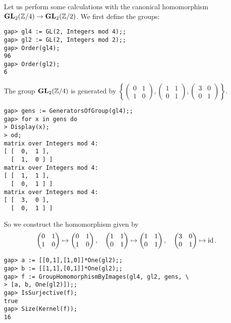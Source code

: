 \begin{example}
    Let us perform some calculations with the canonical homomorphism 
    $\mathbf{GL}_2(\mathbb{Z}/4)\to \mathbf{GL}_2(\mathbb{Z}/2)$. We first
    define the groups:
\begin{lstlisting}
gap> gl4 := GL(2, Integers mod 4);;
gap> gl2 := GL(2, Integers mod 2);;
gap> Order(gl4);
96
gap> Order(gl2);
6
\end{lstlisting}
The group $\mathbf{GL}_2(\mathbb{Z}/4)$ is generated by
$\left\{
\begin{pmatrix}
    0&1\\
    1&0
\end{pmatrix},
\begin{pmatrix}
    1&1\\
    0&1
\end{pmatrix},
\begin{pmatrix}
    3&0\\
    0&1
\end{pmatrix}\right\}$.
\begin{lstlisting}
gap> gens := GeneratorsOfGroup(gl4);;
gap> for x in gens do
> Display(x);
> od;
matrix over Integers mod 4:
[ [  0,  1 ],
  [  1,  0 ] ]
matrix over Integers mod 4:
[ [  1,  1 ],
  [  0,  1 ] ]
matrix over Integers mod 4:
[ [  3,  0 ],
  [  0,  1 ] ]
\end{lstlisting}
So we construct the homomorphism given by
\[
\begin{pmatrix}
    0&1\\
    1&0
\end{pmatrix}\mapsto
\begin{pmatrix}
    0&1\\
    1&0
\end{pmatrix},
\quad 
\begin{pmatrix}
    1&1\\
    0&1
\end{pmatrix}\mapsto
\begin{pmatrix}
    1&1\\
    0&1
\end{pmatrix},
\quad\begin{pmatrix}
    3&0\\
    0&1
\end{pmatrix}\mapsto\operatorname{id}.
\]
\begin{lstlisting}
gap> a := [[0,1],[1,0]]*One(gl2);;
gap> b := [[1,1],[0,1]]*One(gl2);;
gap> f := GroupHomomorphismByImages(gl4, gl2, gens, \
> [a, b, One(gl2)]);;
gap> IsSurjective(f);
true
gap> Size(Kernel(f));
16
\end{lstlisting}
\end{example}

